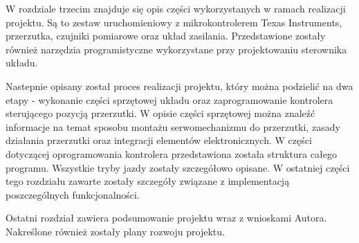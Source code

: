 W rozdziale trzecim znajduje się opis części wykorzystanych w ramach realizacji projektu. Są to zestaw uruchomieniowy z mikrokontrolerem Texas Instruments, przerzutka, czujniki pomiarowe oraz układ zasilania. Przedstawione zostały również narzędzia programistyczne wykorzystane przy projektowaniu sterownika układu. 

Nastepnie opisany został proces realizacji projektu, który można podzielić na dwa etapy - wykonanie części sprzętowej układu oraz zaprogramowanie kontrolera sterującego pozycją przerzutki. W opisie części sprzętowej można znaleźć informacje na temat sposobu montażu serwomechanizmu do przerzutki, zasady działania przerzutki oraz integracji elementów elektronicznych. W części dotyczącej oprogramowania kontrolera przedstawiona została struktura całego programu. Wszystkie tryby jazdy zostały szczegółowo opisane. W ostatniej części tego rozdziału zawarte zostały szczegóły związane z implementacją poszczególnych funkcjonalności.

Ostatni rozdział zawiera podsumowanie projektu wraz z wnioskami Autora. Nakreślone również zostały plany rozwoju projektu.